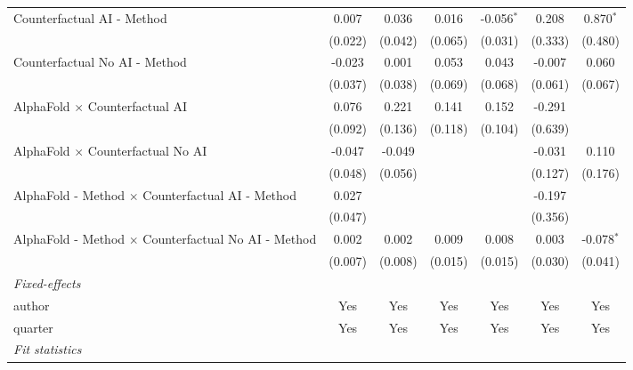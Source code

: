 \begin{tabular}{lcccccc}
   Counterfactual AI - Method                                 & 0.007       & 0.036   & 0.016   & -0.056$^{*}$ & 0.208       & 0.870$^{*}$\\   
                                                              & (0.022)     & (0.042) & (0.065) & (0.031)      & (0.333)     & (0.480)\\   
   Counterfactual No AI - Method                              & -0.023      & 0.001   & 0.053   & 0.043        & -0.007      & 0.060\\   
                                                              & (0.037)     & (0.038) & (0.069) & (0.068)      & (0.061)     & (0.067)\\   
   AlphaFold $\times$ Counterfactual AI                       & 0.076       & 0.221   & 0.141   & 0.152        & -0.291      &   \\   
                                                              & (0.092)     & (0.136) & (0.118) & (0.104)      & (0.639)     &   \\   
   AlphaFold $\times$ Counterfactual No AI                    & -0.047      & -0.049  &         &              & -0.031      & 0.110\\   
                                                              & (0.048)     & (0.056) &         &              & (0.127)     & (0.176)\\   
   AlphaFold - Method $\times$ Counterfactual AI - Method     & 0.027       &         &         &              & -0.197      &   \\   
                                                              & (0.047)     &         &         &              & (0.356)     &   \\   
   AlphaFold - Method $\times$ Counterfactual No AI - Method  & 0.002       & 0.002   & 0.009   & 0.008        & 0.003       & -0.078$^{*}$\\   
                                                              & (0.007)     & (0.008) & (0.015) & (0.015)      & (0.030)     & (0.041)\\   
   \midrule
   \emph{Fixed-effects}\\
   author                                                     & Yes         & Yes     & Yes     & Yes          & Yes         & Yes\\  
   quarter                                                    & Yes         & Yes     & Yes     & Yes          & Yes         & Yes\\  
   \midrule
   \emph{Fit statistics}\\

\end{tabular}
